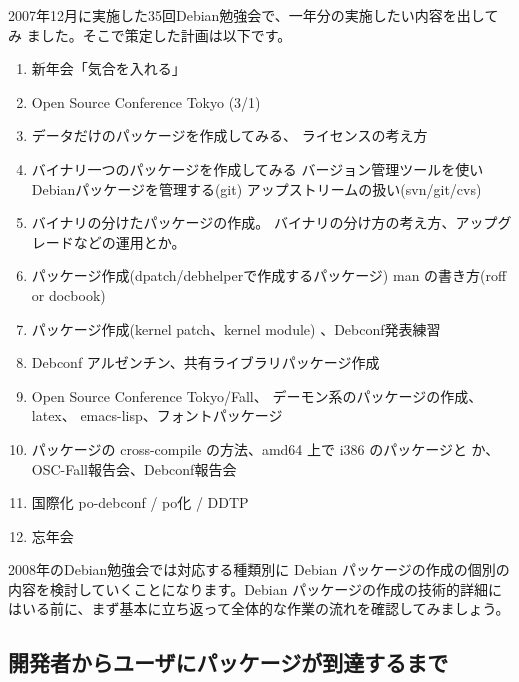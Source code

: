 \documentclass[mingoth,a4paper]{jsarticle}
\begin{document}
\label{sec:2008plan}

2007年12月に実施した35回Debian勉強会で、一年分の実施したい内容を出してみ
ました。そこで策定した計画は以下です。

\begin{enumerate}
 \item 新年会「気合を入れる」
 \item Open Source Conference Tokyo (3/1)
 \item データだけのパッケージを作成してみる、
       ライセンスの考え方
 \item バイナリ一つのパッケージを作成してみる
       バージョン管理ツールを使いDebianパッケージを管理する(git)
       アップストリームの扱い(svn/git/cvs)
 \item バイナリの分けたパッケージの作成。
       バイナリの分け方の考え方、アップグレードなどの運用とか。
 \item パッケージ作成(dpatch/debhelperで作成するパッケージ)
       man の書き方(roff or docbook)
 \item パッケージ作成(kernel patch、kernel module)
       、Debconf発表練習
 \item Debconf アルゼンチン、共有ライブラリパッケージ作成

 \item Open Source Conference Tokyo/Fall、
       デーモン系のパッケージの作成、latex、 emacs-lisp、フォントパッケージ
 \item パッケージの cross-compile の方法、amd64 上で i386 のパッケージと
       か、OSC-Fall報告会、Debconf報告会
 \item 国際化 po-debconf / po化 / DDTP
 \item 忘年会
\end{enumerate}

\label{sec:debpkgmaint}

 
2008年のDebian勉強会では対応する種類別に Debian パッケージの作成の個別の
内容を検討していくことになります。Debian パッケージの作成の技術的詳細に
はいる前に、まず基本に立ち返って全体的な作業の流れを確認してみましょう。

 \subsection{開発者からユーザにパッケージが到達するまで}
\end{document}
